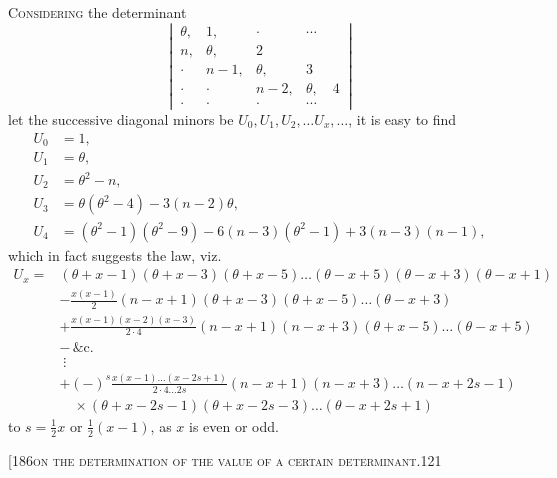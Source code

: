 \documentclass[11pt]{article}
\begin{document}
\medskip
\noindent \textsc{Considering} the determinant
\[
\left|\,\begin{array}{cccc}
\theta, & 1, & \cdot & \cdots\\
n, & \theta, & 2 & \\
\cdot & n-1, & \theta, & 3\\
\cdot & \cdot & n-2, & \theta, \quad 4\\
\cdot & \cdot & \cdot & \cdots
\end{array}\,\right|
\]
let the successive diagonal minors be $U_{0}, U_{1}, U_{2},\ldots U_{x},\ldots$, it is easy to find
\[
\begin{aligned}
U_{0} &= 1,\\
U_{1} &= \theta,\\
U_{2} &= \theta^{2} - n,\\
U_{3} &= \theta(\theta^{2}-4) - 3(n-2)\theta,\\
U_{4} &= (\theta^{2}-1)(\theta^{2}-9) - 6(n-3)(\theta^{2}-1) + 3(n-3)(n-1),
\end{aligned}
\]
which in fact suggests the law, viz.
\[
\begin{aligned}
U_{x} = {}&(\theta+x-1)(\theta+x-3)(\theta+x-5)\ldots(\theta-x+5)(\theta-x+3)(\theta-x+1)\\
&-\frac{x(x-1)}{2}(n-x+1)(\theta+x-3)(\theta+x-5)\ldots(\theta-x+3)\\
&+\frac{x(x-1)(x-2)(x-3)}{2\cdot 4}(n-x+1)(n-x+3)(\theta+x-5)\ldots(\theta-x+5)\\
&-\,\&\text{c.}\\
&\;\vdots\\
&+(-)^{s}\frac{x(x-1)\ldots(x-2s+1)}{2\cdot 4\ldots 2s}(n-x+1)(n-x+3)\ldots(n-x+2s-1)\\
&\quad\times(\theta+x-2s-1)(\theta+x-2s-3)\ldots(\theta-x+2s+1)
\end{aligned}
\]
to $s = \tfrac{1}{2}x$ or $\tfrac{1}{2}(x-1)$, as $x$ is even or odd.

\begin{center}\small[186\hfill\textsc{on the determination of the value of a certain determinant.}\hfill\textsc{121}\end{center}
\end{document}
